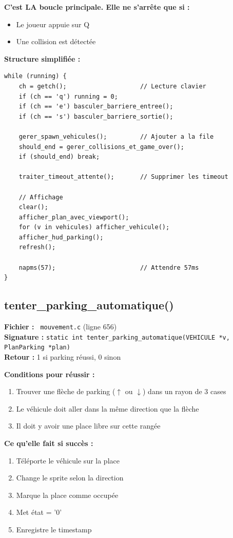 \documentclass[11pt,a4paper]{article}
\newcommand{\code}[1]{\texttt{\textcolor{accent}{#1}}}
\newcommand{\fichier}[1]{\texttt{\textcolor{primary}{\faIcon{file-code} #1}}}
\begin{document}
\textbf{C'est LA boucle principale. Elle ne s'arrête que si :}
\begin{itemize}[noitemsep]
    \item Le joueur appuie sur Q
    \item Une collision est détectée
\end{itemize}

\textbf{Structure simplifiée :}
\begin{lstlisting}
while (running) {
    ch = getch();                    // Lecture clavier
    if (ch == 'q') running = 0;
    if (ch == 'e') basculer_barriere_entree();
    if (ch == 's') basculer_barriere_sortie();

    gerer_spawn_vehicules();         // Ajouter a la file
    should_end = gerer_collisions_et_game_over();
    if (should_end) break;

    traiter_timeout_attente();       // Supprimer les timeout

    // Affichage
    clear();
    afficher_plan_avec_viewport();
    for (v in vehicules) afficher_vehicule();
    afficher_hud_parking();
    refresh();

    napms(57);                       // Attendre 57ms
}
\end{lstlisting}

\subsection{tenter\_parking\_automatique()}

\begin{funcbox}
\textbf{Fichier :} \fichier{mouvement.c} (ligne 656)\\
\textbf{Signature :} \code{static int tenter\_parking\_automatique(VEHICULE *v, PlanParking *plan)}\\
\textbf{Retour :} 1 si parking réussi, 0 sinon
\end{funcbox}

\textbf{Conditions pour réussir :}
\begin{enumerate}[noitemsep]
    \item Trouver une flèche de parking ($\uparrow$ ou $\downarrow$) dans un rayon de 3 cases
    \item Le véhicule doit aller dans la même direction que la flèche
    \item Il doit y avoir une place libre sur cette rangée
\end{enumerate}

\textbf{Ce qu'elle fait si succès :}
\begin{enumerate}[noitemsep]
    \item Téléporte le véhicule sur la place
    \item Change le sprite selon la direction
    \item Marque la place comme occupée
    \item Met état = '0'
    \item Enregistre le timestamp
\end{enumerate}
\end{document}

